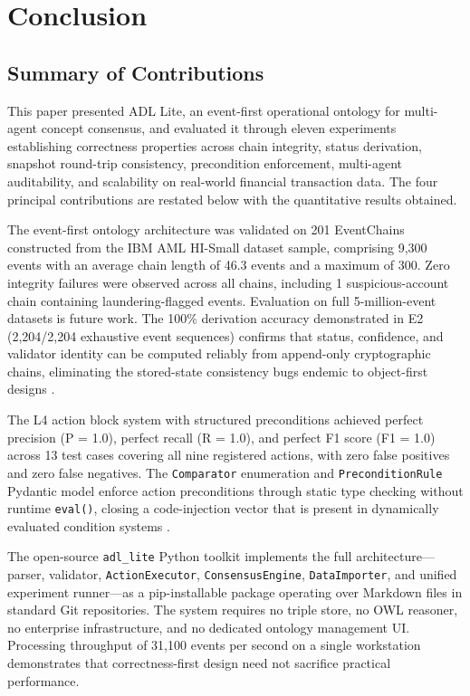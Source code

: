 \section{Conclusion}\label{conclusion}

\subsection{Summary of Contributions}\label{summary-of-contributions}

This paper presented ADL Lite, an event-first operational ontology for multi-agent concept consensus, and evaluated it through eleven experiments establishing correctness properties across chain integrity, status derivation, snapshot round-trip consistency, precondition enforcement, multi-agent auditability, and scalability on real-world financial transaction data. The four principal contributions are restated below with the quantitative results obtained.

The event-first ontology architecture was validated on 201 EventChains constructed from the IBM AML HI-Small dataset sample, comprising 9,300 events with an average chain length of 46.3 events and a maximum of 300. Zero integrity failures were observed across all chains, including 1 suspicious-account chain containing laundering-flagged events. Evaluation on full 5-million-event datasets is future work. The 100\% derivation accuracy demonstrated in E2 (2,204/2,204 exhaustive event sequences) confirms that status, confidence, and validator identity can be computed reliably from append-only cryptographic chains, eliminating the stored-state consistency bugs endemic to object-first designs \cite{ref3}\cite{ref14}.

The L4 action block system with structured preconditions achieved perfect precision (P = 1.0), perfect recall (R = 1.0), and perfect F1 score (F1 = 1.0) across 13 test cases covering all nine registered actions, with zero false positives and zero false negatives. The \texttt{Comparator} enumeration and \texttt{PreconditionRule} Pydantic model enforce action preconditions through static type checking without runtime \texttt{eval()}, closing a code-injection vector that is present in dynamically evaluated condition systems \cite{ref8}.

The open-source \texttt{adl\_lite} Python toolkit implements the full architecture---parser, validator, \texttt{ActionExecutor}, \texttt{ConsensusEngine}, \texttt{DataImporter}, and unified experiment runner---as a pip-installable package operating over Markdown files in standard Git repositories. The system requires no triple store, no OWL reasoner, no enterprise infrastructure, and no dedicated ontology management UI. Processing throughput of 31,100 events per second on a single workstation demonstrates that correctness-first design need not sacrifice practical performance.

